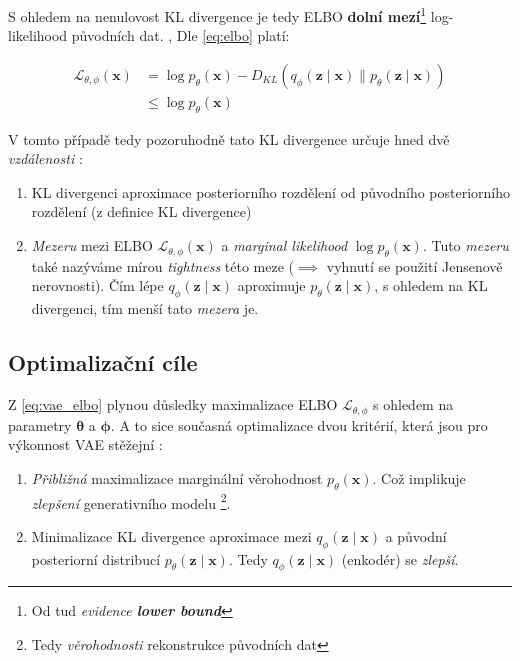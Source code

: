 S ohledem na nenulovost KL divergence je tedy ELBO \textbf{dolní mezí}\footnote{Od tud \emph{evidence \textbf{lower bound}}} log-likelihood původních dat. \cite{Kingma2014}, \cite{Goodfellow2016}
Dle \autoref{eq:elbo} platí:

\begin{align}
    \mathcal{L}_{\theta,\phi}(\textbf{x}) &= \log p_\theta(\textbf{x}) - D_{KL}(q_\phi(\textbf{z}\mid\textbf{x})\parallel p_\theta(\textbf{z}\mid\textbf{x})) \\ \label{eq:vae_optimization_objective}
                                          &\leq \log p_\theta(\textbf{x})
\end{align}

V tomto případě tedy pozoruhodně tato KL divergence určuje hned dvě \emph{vzdálenosti} \cite{Kingma2019}:
\begin{enumerate}
    \item KL divergenci aproximace posteriorního rozdělení od původního posteriorního rozdělení (z definice KL divergence)
    \item \emph{Mezeru} mezi ELBO $\mathcal{L}_{\theta,\phi}(\textbf{x})$ a \emph{marginal likelihood} $\log p_\theta(\textbf{x})$. Tuto \emph{mezeru} také nazýváme mírou \emph{tightness} této meze ($\implies$ vyhnutí se použití Jensenově nerovnosti). Čím lépe $q_\phi(\textbf{z}\mid\textbf{x})$ aproximuje $p_\theta(\textbf{z}\mid\textbf{x})$, s ohledem na KL divergenci, tím menší tato \emph{mezera} je.
\end{enumerate}

\subsection{Optimalizační cíle}
Z \autoref{eq:vae_elbo} plynou důsledky maximalizace ELBO $\mathcal{L_{\theta,\phi}}$ s ohledem na parametry $\boldsymbol{\theta}$ a $\boldsymbol{\phi}$.
A to sice současná optimalizace dvou kritérií, která jsou pro výkonnost VAE stěžejní \cite{Kingma2019}:

\begin{enumerate}
    \item \emph{Přibližná} maximalizace marginální věrohodnost $p_\theta(\textbf{x})$. Což implikuje \emph{zlepšení} generativního modelu \footnote{Tedy \emph{věrohodnosti} rekonstrukce původních dat}.
    \item Minimalizace KL divergence aproximace mezi $q_\phi(\textbf{z}\mid\textbf{x})$ a původní posteriorní distribucí $p_\theta(\textbf{z}\mid\textbf{x})$. Tedy $q_\phi(\textbf{z}\mid\textbf{x})$ (enkodér) se \emph{zlepší}.
\end{enumerate}
